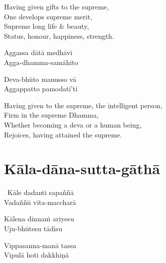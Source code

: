 \begin{english-verses}
  Having given gifts to the supreme,\\
  One develops supreme merit,\\
  Supreme long life \& beauty,\\
  Status, honour, happiness, strength.
\end{english-verses}

\begin{pali-hang}
  Aggassa dātā medhāvī\\
  Agga-dhamma-samāhito
\end{pali-hang}
\begin{pali-hangtogether}
  Deva-bhūto manusso vā\\
  Aggappatto pamodatī'ti
\end{pali-hangtogether}

\begin{english-verses}
  Having given to the supreme, the intelligent person,\\
  Firm in the supreme Dhamma,\\
  Whether becoming a deva or a human being,\\
  Rejoices, having attained the supreme.
\end{english-verses}

\suttaRef{[AN 5.32]}

\section{Kāla-dāna-sutta-gāthā}
\label{kala-dana-sutta-gatha}

\begin{pali-hangtogether}
  \anglebracketleft\ \hspace{-0.5mm}Kāle dadanti sapaññā \hspace{-0.5mm}\anglebracketright\ \\
  Vadaññū vīta-maccharā
\end{pali-hangtogether}
\begin{pali-hangtogether}
  Kālena dinnaṁ ariyesu\\
  Uju-bhūtesu tādisu
\end{pali-hangtogether}
\begin{pali-hangtogether}
  Vippasanna-manā tassa\\
  Vipulā hoti dakkhiṇā
\end{pali-hangtogether}

